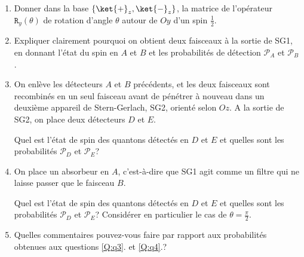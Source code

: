 \begin{enumerate}
\item  Donner dans la base $\{\ket{+}_{z},\ket{-}_{z}\}$, la matrice de
l'opérateur $\mathtt{R}_{y}(\theta)$ de rotation d'angle $\theta$ autour de $Oy$
d'un spin $\frac{1}{2}$.

\item Expliquer clairement pourquoi on obtient deux faisceaux à la sortie de
SG1, en donnant l'état du spin en $A$ et $B$ et les probabilités de détection
$\mathcal{P}_{A}$ et $\mathcal{P}_{B}$.

\item\label{Q:q3} On enlève les détecteurs $A$ et $B$ précédents, et les deux
faisceaux sont recombinés en un seul faisceau avant de pénétrer à nouveau dans
un deuxième appareil de Stern-Gerlach, SG2, orienté selon $Oz$. A la sortie de
SG2, on place deux détecteurs $D$ et $E$.

Quel est l'état de spin des quantons détectés en $D$ et $E$ et quelles sont les
probabilités $\mathcal{P}_{D}$ et $\mathcal{P}_{E}$?

\item\label{Q:q4}On place un absorbeur en $A$, c'est-à-dire que SG1 agit comme
un filtre qui ne laisse passer que le faisceau $B$.

Quel est l'état de spin des quantons détectés en $D$ et $E$ et quelles sont les
probabilités $\mathcal{P}_{D}$ et $\mathcal{P}_{E}$? Considérer en particulier
le cas de $\theta=\frac{\pi}{2}$.

\item Quelles commentaires pouvez-vous faire par rapport aux probabilités
obtenues aux questions \ref{Q:q3}. et \ref{Q:q4}.?
\end{enumerate}

